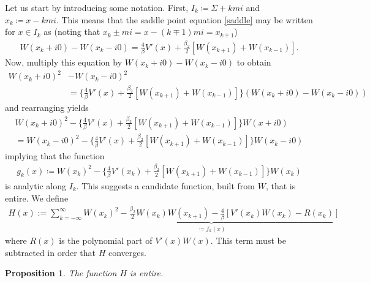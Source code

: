 \documentclass[10pt]{article}
\theoremstyle{plain}
\newtheorem{prop}[theorem]{Proposition}
\theoremstyle{definition}
\theoremstyle{plain}
\begin{document}
Let us start by introducing some notation. First, $I_k \coloneqq \Sigma+kmi$ and $x_k \coloneqq x-kmi$. This means that the saddle point equation \ref{saddle} may be written for $x\in I_k$ as (noting that $x_k \pm mi = x -(k\mp1)mi=x_{k\mp 1}$)
\begin{align*}
	W(x_k + i0) - W(x_k - i0) = \frac{4}{\beta}V'(x)+\frac{\beta_2}{2}[W(x_{k+1})+W(x_{k-1})].
\end{align*}
Now, multiply this equation by $W(x_k + i0) - W(x_k - i0)$ to obtain
\begin{align*}
	W(x_k +i0)^2 &- W(x_k-i0)^2\\ &= \bigg\{ \frac{4}{\beta}V'(x)+\frac{\beta_2}{2}[W(x_{k+1})+W(x_{k-1})] \bigg\}(W(x_k+i0)-W(x_k-i0)) 
\end{align*}
and rearranging yields
\begin{align*}
	W(x_k+i0)^2-\bigg\{\frac{4}{\beta}V'(x)+\frac{\beta_2}{2}[W(x_{k+1})+W(x_{k-1})]\bigg\}W(x+i0) \\ = W(x_k-i0)^2 - \bigg\{\frac{4}{\beta}V'(x)+\frac{\beta_2}{2}[W(x_{k+1})+W(x_{k-1})]\bigg\}W(x_k-i0)
\end{align*}
implying that the function 
\begin{align*}
	g_k(x) \coloneqq W(x_k)^2 - \bigg\{\frac{4}{\beta}V'(x_k)+\frac{\beta_2}{2}[W(x_{k+1})+W(x_{k-1})]\bigg\}W(x_k)
\end{align*}
is analytic along $I_k$. This suggests a candidate function, built from $W$, that is entire. We define
\begin{align*}
	H(x) := \sum_{k=-\infty}^\infty\underbrace{ W(x_k)^2 - \frac{\beta_2}{2}W(x_k)W(x_{k+1})-\frac{4}{\beta}[V'(x_k)W(x_k)-R(x_k)]}_{\coloneqq f_k(x)}
\end{align*}
where $R(x)$ is the polynomial part of $V'(x)W(x)$. This term must be subtracted in order that $H$ converges.

\begin{prop}
	The function $H$ is entire. 
\end{prop}
\end{document}

